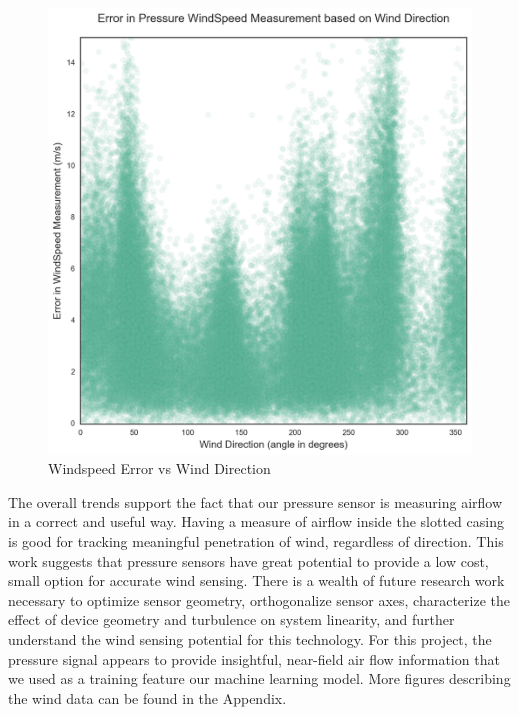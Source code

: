 \begin{figure}[htb]
 	\includegraphics[width=\textwidth]{figs/ws_error_vs_wd}               
 	 \caption{Windspeed Error vs Wind Direction}
  	\label{fig:ws_error_vs_wd}
\end{figure}

The overall trends support the fact that our pressure sensor is measuring airflow in a correct and useful way.  Having a measure of airflow inside the slotted casing is good for tracking meaningful penetration of wind, regardless of direction.  This work suggests that pressure sensors have great potential to provide a low cost, small option for accurate wind sensing.  There is a wealth of future research work necessary to optimize sensor geometry, orthogonalize sensor axes, characterize the effect of device geometry and turbulence on system linearity, and further understand the wind sensing potential for this technology.  For this project, the pressure signal appears to provide insightful, near-field air flow information that we used as a training feature our machine learning model.  More figures describing the wind data can be found in the Appendix.
